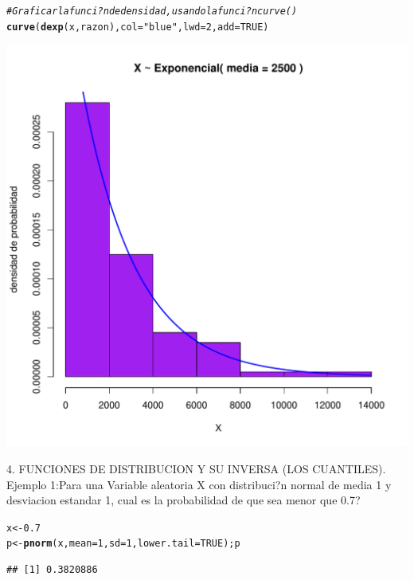 \documentclass[10pt,a4paper]{article}\usepackage[]{graphicx}\usepackage[]{color}
\makeatletter
\def\maxwidth{ %
  \ifdim\Gin@nat@width>\linewidth
    \linewidth
  \else
    \Gin@nat@width
  \fi
}
\newcommand{\hlnum}[1]{\textcolor[rgb]{0.686,0.059,0.569}{#1}}%
\newcommand{\hlstr}[1]{\textcolor[rgb]{0.192,0.494,0.8}{#1}}%
\newcommand{\hlcom}[1]{\textcolor[rgb]{0.678,0.584,0.686}{\textit{#1}}}%
\newcommand{\hlstd}[1]{\textcolor[rgb]{0.345,0.345,0.345}{#1}}%
\newcommand{\hlkwb}[1]{\textcolor[rgb]{0.69,0.353,0.396}{#1}}%
\newcommand{\hlkwc}[1]{\textcolor[rgb]{0.333,0.667,0.333}{#1}}%
\newcommand{\hlkwd}[1]{\textcolor[rgb]{0.737,0.353,0.396}{\textbf{#1}}}%
\newenvironment{kframe}{%
 \def\at@end@of@kframe{}%
 \ifinner\ifhmode%
  \def\at@end@of@kframe{\end{minipage}}%
  \begin{minipage}{\columnwidth}%
 \fi\fi%
 \def\FrameCommand##1{\hskip\@totalleftmargin \hskip-\fboxsep
 \colorbox{shadecolor}{##1}\hskip-\fboxsep
     \hskip-\linewidth \hskip-\@totalleftmargin \hskip\columnwidth}%
 \MakeFramed {\advance\hsize-\width
   \@totalleftmargin\z@ \linewidth\hsize
   \@setminipage}}%
 {\par\unskip\endMakeFramed%
 \at@end@of@kframe}
\newenvironment{knitrout}{}{} %
\makeatother
\begin{document}
\begin{knitrout}
\begin{kframe}
\begin{alltt}
\hlcom{# Graficar la funci?n de densidad, usando la funci?n curve() }
\hlkwd{curve}\hlstd{(}\hlkwd{dexp}\hlstd{(x, razon),} \hlkwc{col}\hlstd{=}\hlstr{"blue"}\hlstd{,} \hlkwc{lwd}\hlstd{=}\hlnum{2}\hlstd{,} \hlkwc{add}\hlstd{=}\hlnum{TRUE}\hlstd{)}
\end{alltt}
\end{kframe}
\includegraphics[width=\maxwidth]{figure/unnamed-chunk-7-1} 

\end{knitrout}

4. FUNCIONES DE DISTRIBUCION Y SU INVERSA (LOS CUANTILES).
Ejemplo 1:Para una Variable aleatoria X con distribuci?n normal de media 1 y desviacion estandar 1, cual es la probabilidad de que sea menor que 0.7? 
\begin{knitrout}
\color{fgcolor}\begin{kframe}
\begin{alltt}
\hlstd{x} \hlkwb{<-} \hlnum{0.7}
\hlstd{p} \hlkwb{<-} \hlkwd{pnorm}\hlstd{(x,} \hlkwc{mean}\hlstd{=}\hlnum{1}\hlstd{,} \hlkwc{sd}\hlstd{=}\hlnum{1}\hlstd{,} \hlkwc{lower.tail} \hlstd{=} \hlnum{TRUE}\hlstd{); p}
\end{alltt}
\begin{verbatim}
## [1] 0.3820886
\end{verbatim}
\end{kframe}
\end{knitrout}
\end{document}
